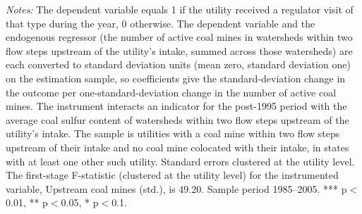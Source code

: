 \begin{table}[htbp]
\begin{minipage}{\linewidth}
\footnotesize
\raggedright
\textit{Notes:} The dependent variable equals 1 if the utility received a regulator visit of that type during the year, 0 otherwise. The dependent variable and the endogenous regressor (the number of active coal mines in watersheds within two flow steps upstream of the utility's intake, summed across those watersheds) are each converted to standard deviation units (mean zero, standard deviation one) on the estimation sample, so coefficients give the standard-deviation change in the outcome per one-standard-deviation change in the number of active coal mines. The instrument interacts an indicator for the post-1995 period with the average coal sulfur content of watersheds within two flow steps upstream of the utility's intake. The sample is utilities with a coal mine within two flow steps upstream of their intake and no coal mine colocated with their intake, in states with at least one other such utility. Standard errors clustered at the utility level. The first-stage F-statistic (clustered at the utility level) for the instrumented variable, Upstream coal mines (std.), is 49.20. Sample period 1985--2005. *** p$<$0.01, ** p$<$0.05, * p$<$0.1.
\end{minipage}
\end{table}
